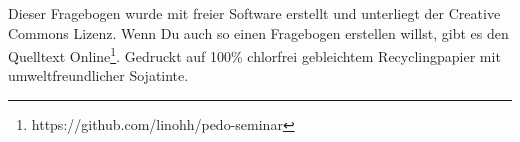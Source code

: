 \documentclass[a4paper,10pt,BCOR10mm,oneside,headsepline]{scrartcl}
\begin{document}
          \vfill %
          Dieser Fragebogen wurde mit freier Software erstellt und unterliegt der Creative Commons Lizenz. Wenn Du auch so einen Fragebogen erstellen willst, gibt es den Quelltext Online\footnote{https://github.com/linohh/pedo-seminar}.
          \vskip0.5cm
          \cc \bysa \hskip0.2cm \small{Gedruckt auf 100\% chlorfrei gebleichtem Recyclingpapier mit umweltfreundlicher Sojatinte.}


              
\end{document}
